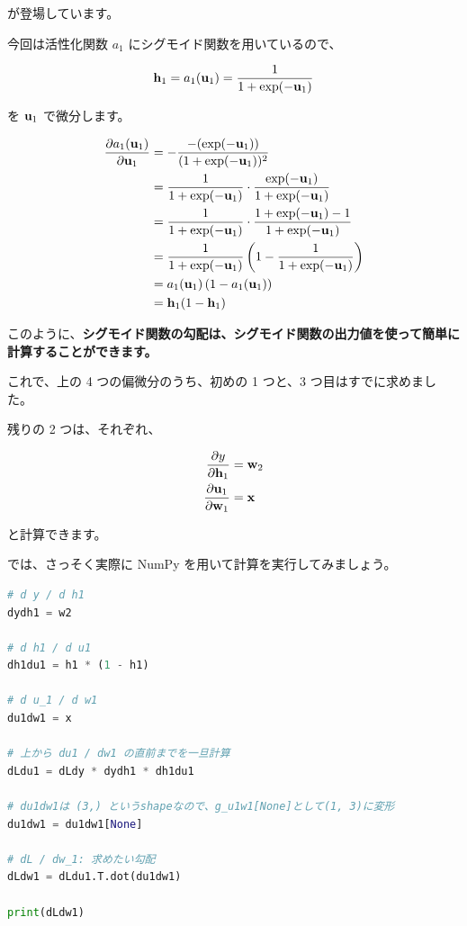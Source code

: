 が登場しています。

今回は活性化関数 $a_1$ にシグモイド関数を用いているので、


\[
{\bf h}_1 = a_1({\bf u}_1) = \frac{1}{1 + \exp(-{\bf u}_1)}
\]


を ${\bf u}_1$ で微分します。


\[
\begin{aligned}
\frac{\partial a_1({\bf u}_1)}{\partial {\bf u}_1}
&= -\frac{-(\exp(-{\bf u}_1))}{(1 + \exp(-{\bf u}_1))^2} \\
&= \frac{1}{1 + \exp(-{\bf u}_1)} \cdot \frac{\exp(-{\bf u}_1)}{1 + \exp(-{\bf u}_1)} \\
&= \frac{1}{1 + \exp(-{\bf u}_1)} \cdot \frac{1 + \exp(-{\bf u}_1) - 1}{1 + \exp(-{\bf u}_1)} \\
&= \frac{1}{1 + \exp(-{\bf u}_1)} \left(1 - \frac{1}{1 + \exp(-{\bf u}_1)}\right) \\
&= a_1({\bf u}_1)\left(1 - a_1({\bf u}_1)\right) \\
&= {\bf h}_1 ( 1 - {\bf h}_1 )
\end{aligned}
\]


このように、\textbf{シグモイド関数の勾配は、シグモイド関数の出力値を使って簡単に計算することができます。}


これで、上の 4 つの偏微分のうち、初めの 1 つと、3 つ目はすでに求めました。

残りの 2 つは、それぞれ、


\[
\begin{aligned}
\frac{\partial y}{\partial {\bf h}_1}
&= {\bf w}_2 \\
\frac{\partial {\bf u}_1}{\partial {\bf w}_1}
&= {\bf x}
\end{aligned}
\]


と計算できます。

では、さっそく実際に NumPy を用いて計算を実行してみましょう。


\begin{lstlisting}[style=codecell,language=Python]
# d y / d h1
dydh1 = w2

# d h1 / d u1
dh1du1 = h1 * (1 - h1)

# d u_1 / d w1
du1dw1 = x

# 上から du1 / dw1 の直前までを一旦計算
dLdu1 = dLdy * dydh1 * dh1du1

# du1dw1は (3,) というshapeなので、g_u1w1[None]として(1, 3)に変形
du1dw1 = du1dw1[None]

# dL / dw_1: 求めたい勾配
dLdw1 = dLdu1.T.dot(du1dw1)

print(dLdw1)
\end{lstlisting}

